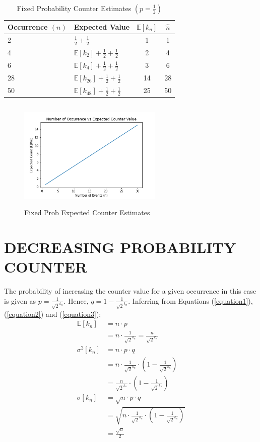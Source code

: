 \documentclass[longpaper, english, final, times]{revdetua}
\begin{document}
		\begin{table}[!ht!]
			\begin{center}
				\label{table:fixedProbCounterExpectedEstimate}
				\caption{Fixed Probability Counter Estimates $\left(p=\frac{1}{2}\right)$}	
				{\def\arraystretch{2}%
					\begin{tabular}{l|l|c|c}
						\toprule
						Occurrence $(n)$ & Expected Value& $\mathbb{E}[k_n]$ & $\widehat{n}$\\
						\hline
						2&$\frac{1}{2}+\frac{1}{2}$&1&1\\
						4&$\mathbb{E}[k_{2}]+\frac{1}{2}+\frac{1}{2}$&2&4\\
						6& $\mathbb{E}[k_{4}]+\frac{1}{2}+\frac{1}{2}$&3&6\\
						28 & $\mathbb{E}[k_{26}]+\frac{1}{2}+\frac{1}{2}$&14&28\\
						50 & $\mathbb{E}[k_{48}]+\frac{1}{2}+\frac{1}{2}$&25&50\\
						\bottomrule
					\end{tabular}
				}
			\end{center}
		\end{table}
	
		\begin{figure}[ht!]
			\centering
			\caption{Fixed Prob Expected Counter Estimates}
			\includegraphics[width=260px, height=200px]{imgs/fixed.png}		
		\end{figure}	
	
	\section{DECREASING PROBABILITY COUNTER}
		The probability of increasing the counter value for a given occurrence in this case is given as $p=\frac{1}{\sqrt{2}^{k_n}}$. Hence, $q=1-\frac{1}{\sqrt{2}^{k_n}}$.
		Inferring from Equations (\ref{equation1}), (\ref{equation2}) and (\ref{equation3});
		\begin{align*}
			\mathbb{E}[k_n] &= n\cdot p\\
			&=n\cdot \frac{1}{\sqrt{2}^{k_n}}=\frac{n}{\sqrt{2}^{k_n}} \\
			\sigma^2[k_n] &= n\cdot p\cdot q\\
			&=n\cdot \frac{1}{\sqrt{2}^{k_n}} \cdot \left(1-\frac{1}{\sqrt{2}^{k_n}}\right) \\ 
			&=\frac{n}{\sqrt{2}^{k_n}}\cdot \left(1-\frac{1}{\sqrt{2}^{k_n}}\right) \\
			\sigma[k_n] &= \sqrt{n\cdot p\cdot q}\\
			&=\sqrt{n\cdot \frac{1}{\sqrt{2}^{k_n}} \cdot \left(1-\frac{1}{\sqrt{2}^{k_n}}\right) }\\
			&=\frac{\sqrt{n}}{2}
		\end{align*}
	
\end{document}
